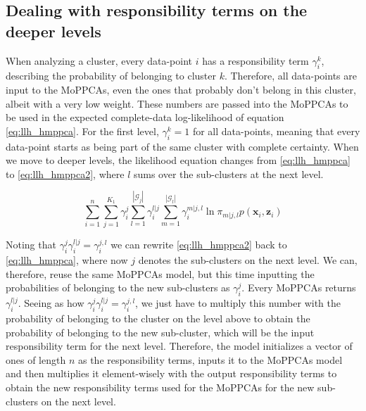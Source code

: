 \subsection{Dealing with responsibility terms on the deeper levels}
When analyzing a cluster, every data-point $i$ has a responsibility term $\gamma^k_i$, describing the probability of belonging to cluster $k$. Therefore, all data-points are input to the MoPPCAs, even the ones that probably don't belong in this cluster, albeit with a very low weight. These numbers are passed into the MoPPCAs to be used in the expected complete-data log-likelihood of equation \ref{eq:llh_hmppca}. For the first level, $\gamma^k_i = 1$ for all data-points, meaning that every data-point starts as being part of the same cluster with complete certainty. When we move to deeper levels, the likelihood equation changes from \ref{eq:llh_hmppca} to \ref{eq:llh_hmppca2}, where $l$ sums over the sub-clusters at the next level.

\begin{equation}\label{eq:llh_hmppca2}
    \sum^n_{i=1} \sum^{K_1}_{j=1} \gamma^j_i \sum^{|\mathcal{G}_j|}_{l=1} \gamma^{l|j}_i \sum_{m=1}^{|\mathcal{G}_l|} \gamma^{m|j,l}_i \ln{\pi_{m|j,l} p(\bm{x}_i,\bm{z}_i)}
\end{equation}

Noting that $\gamma^j_i \gamma^{l|j}_i = \gamma^{j,l}_i$ we can rewrite \ref{eq:llh_hmppca2} back to \ref{eq:llh_hmppca}, where now $j$ denotes the sub-clusters on the next level. We can, therefore, reuse the same MoPPCAs model, but this time inputting the probabilities of belonging to the new sub-clusters as $\gamma^j_i$. Every MoPPCAs returns $\gamma^{l|j}_i$. Seeing as how $\gamma^j_i \gamma^{l|j}_i = \gamma^{j,l}_i$, we just have to multiply this number with the probability of belonging to the cluster on the level above to obtain the probability of belonging to the new sub-cluster, which will be the input responsibility term for the next level. Therefore, the model initializes a vector of ones of length $n$ as the responsibility terms, inputs it to the MoPPCAs model and then multiplies it element-wisely with the output responsibility terms to obtain the new responsibility terms used for the MoPPCAs for the new sub-clusters on the next level.


